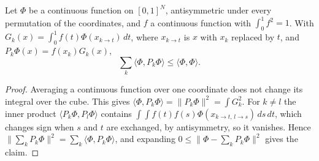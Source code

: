 \begin{lemma}
  \label{lem:pauli}
  \leanok
  Let $\Phi$ be a continuous function on $[0,1]^N$, antisymmetric under every permutation of the coordinates,
  and $f$ a continuous function with $\int_0^1f^2=1$. With
  $G_k(x)=\int_0^1f(t)\Phi(x_{k\to t})\,dt$, where $x_{k\to t}$ is $x$ with $x_k$ replaced by $t$, and
  $P_k\Phi(x)=f(x_k)G_k(x)$,
  \[ \sum_k\langle\Phi,P_k\Phi\rangle\le\langle\Phi,\Phi\rangle. \]
\end{lemma}
\begin{proof}
  \leanok
  Averaging a continuous function over one coordinate does not change its integral over the cube. This gives
  $\langle\Phi,P_k\Phi\rangle=\|P_k\Phi\|^2=\int G_k^2$. For $k\neq l$ the inner product $\langle P_k\Phi,P_l\Phi\rangle$
  contains $\int\!\int f(t)f(s)\Phi(x_{k\to t,\,l\to s})\,ds\,dt$, which changes sign when $s$ and $t$ are exchanged,
  by antisymmetry, so it vanishes. Hence $\|\sum_kP_k\Phi\|^2=\sum_k\langle\Phi,P_k\Phi\rangle$, and expanding
  $0\le\|\Phi-\sum_kP_k\Phi\|^2$ gives the claim.
\end{proof}

